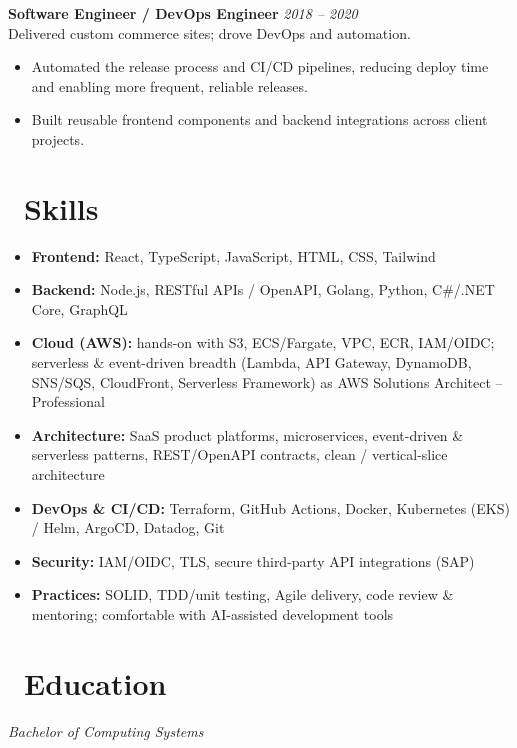 \documentclass{resume}
\begin{document}
\vspace{1em}

\textbf{Software Engineer / DevOps Engineer} \hfill \textit{2018 -- 2020} \\
Delivered custom commerce sites; drove DevOps and automation.
\begin{itemize}
  \item Automated the release process and CI/CD pipelines, reducing deploy time and enabling more frequent, reliable releases.
  \item Built reusable frontend components and backend integrations across client projects.
\end{itemize}


\section{\faCogs\ Skills}
\begin{itemize}[parsep=0.5ex]
  \item \textbf{Frontend:} React, TypeScript, JavaScript, HTML, CSS, Tailwind
  \item \textbf{Backend:} Node.js, RESTful APIs / OpenAPI, Golang, Python, C\#/.NET Core, GraphQL
  \item \textbf{Cloud (AWS):} hands-on with S3, ECS/Fargate, VPC, ECR, IAM/OIDC; serverless \& event-driven breadth (Lambda, API Gateway, DynamoDB, SNS/SQS, CloudFront, Serverless Framework) as AWS Solutions Architect -- Professional
  \item \textbf{Architecture:} SaaS product platforms, microservices, event-driven \& serverless patterns, REST/OpenAPI contracts, clean / vertical-slice architecture
  \item \textbf{DevOps \& CI/CD:} Terraform, GitHub Actions, Docker, Kubernetes (EKS) / Helm, ArgoCD, Datadog, Git
  \item \textbf{Security:} IAM/OIDC, TLS, secure third-party API integrations (SAP)
  \item \textbf{Practices:} SOLID, TDD/unit testing, Agile delivery, code review \& mentoring; comfortable with AI-assisted development tools
\end{itemize}

\section{\faGraduationCap\ Education}
\textit{Bachelor of Computing Systems}
\end{document}
